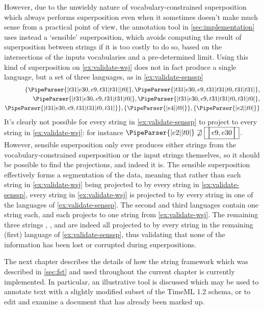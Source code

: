 \documentclass[a4paper,12pt,leqno]{article}
\newcommand{\vph}[1]{\vphantom{#1}}
\newcommand{\ebox}[1]{\fbox{$\vph{'(),}#1$}}
\newcommand{\nbBefore}[2]{\ebox{#1}\ebox{}\ebox{#2}}
\newcommand{\nbDuring}[2]{\ebox{#2}\ebox{#1,#2}\ebox{#2}}
\newcommand{\nbEquals}[2]{\ebox{#1,#2}}
\newcommand{\Before}[2]{\ebox{}\nbBefore{#1}{#2}\ebox{}}
\newcommand{\During}[2]{\ebox{}\nbDuring{#1}{#2}\ebox{}}
\newcommand{\Equals}[2]{\ebox{}\nbEquals{#1}{#2}\ebox{}}
\newcommand{\EventString}[1]{%
	\renewcommand*{\do}[1]{\ebox{##1}}%
	\PipeParser{#1}%
}
\begin{document}
However, due to the unwieldy nature of vocabulary-constrained superposition which always performs superposition even when it sometimes doesn't make much sense from a practical point of view, the annotation tool in \cref{sec:implementation} uses instead a `sensible' superposition, which avoids computing the result of superposition between strings if it is too costly to do so, based on the intersections of the inputs vocabularies and a pre-determined limit. Using this kind of superposition on \cref{ex:validate-wsj} does not in fact produce a single language, but a set of three languages, as in \cref{ex:validate-senssp}
\begin{align}
	\{\EventString{{}|t31|e30,e9,t31|t31|{}|t0|{}}, \EventString{{}|t31|e30,e9,t31|t31|t0,t31|t31|{}},\label{ex:validate-senssp}\\
	\EventString{{}|t31|e30,e9,t31|t31|t0|{}}, \EventString{{}|t31|e30,e9,t31|t31|t0,t31|t0|{}},\notag\\
	\EventString{{}|t31|e30,e9,t31|t31|t0,t31|{}}\}, \{\EventString{{}|e4|{}|t0|{}}\}, \{\EventString{{}|e2|{}|t0|{}}\}\notag
\end{align}
It's clearly not possible for every string in \cref{ex:validate-senssp} to project to every string in \cref{ex:validate-wsj}: for instance $\EventString{{}|e2|{}|t0|{}} \not\sqsupseteq \Equals{e9}{e30}$. However, sensible superposition only ever produces either strings from the vocabulary-constrained superposition or the input strings themselves, so it should be possible to find the projections, and indeed it is. The sensible superposition effectively forms a segmentation of the data, meaning that rather than each string in \cref{ex:validate-wsj} being projected to by every string in \cref{ex:validate-senssp}, every string in \cref{ex:validate-wsj} is projected to by every string in one of the languages of \cref{ex:validate-senssp}. The second and third languages contain one string each, and each projects to one string from \cref{ex:validate-wsj}. The remaining three strings \Equals{e9}{e30}, \Before{e9}{t0}, and \During{e30}{t31} are indeed all projected to by every string in the remaining (first) language of \cref{ex:validate-senssp}, thus validating that none of the information has been lost or corrupted during superpositions.

The next chapter describes the details of how the string framework which was described in \cref{sec:fst} and used throughout the current chapter is currently implemented. In particular, an illustrative tool is discussed which may be used to annotate text with a slightly modified subset of the TimeML 1.2 \citep{timeml2005timeml} schema, or to edit and examine a document that has already been marked up.
\end{document}
